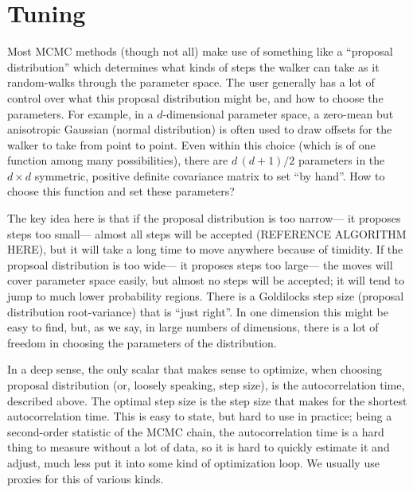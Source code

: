 \documentclass[12pt,twoside,pdftex]{article}
\begin{document}
\section{Tuning}\label{sec:tuning}

Most MCMC methods
  (though not all)
  make use of something like a ``proposal distribution''
  which determines what kinds of steps the walker can take
  as it random-walks through the parameter space.
The user generally has a lot of control over what this proposal distribution might be,
  and how to choose the parameters.
For example, in a $d$-dimensional parameter space, %
  a zero-mean but anisotropic Gaussian (normal distribution)
  is often used to draw offsets for the walker to take from point to point.
Even within this choice (which is of one function among many possibilities),
  there are $d\,(d+1)/2$ parameters in the $d\times d$ symmetric, positive definite covariance matrix
  to set ``by hand''.
How to choose this function and set these parameters?

The key idea here is that if the proposal distribution is too narrow---%
  it proposes steps too small---%
  almost all steps will be accepted (REFERENCE ALGORITHM HERE),
  but it will take a long time to move anywhere because of timidity.
If the propsoal distribution is too wide---%
  it proposes steps too large---%
  the moves will cover parameter space easily,
  but almost no steps will be accepted;
  it will tend to jump to much lower probability regions.
There is a Goldilocks step size (proposal distribution root-variance) that is ``just right''.
In one dimension this might be easy to find,
  but, as we say, in large numbers of dimensions,
  there is a lot of freedom in choosing the parameters of the distribution.
  

In a deep sense, the only scalar that makes sense to optimize,
  when choosing proposal distribution (or, loosely speaking, step size),
  is the autocorrelation time, described above.
The optimal step size is the step size that makes for the shortest autocorrelation time.
This is easy to state, but hard to use in practice;
  being a second-order statistic of the MCMC chain,
  the autocorrelation time is a hard thing to measure without a lot of data,
  so it is hard to quickly estimate it and adjust,
  much less put it into some kind of optimization loop.
We usually use proxies for this of various kinds.
\end{document}
